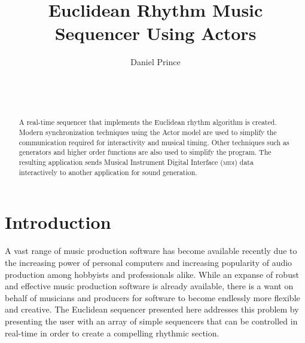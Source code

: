 \documentclass{sig-alternate-05-2015}
\begin{document}

\title{Euclidean Rhythm Music Sequencer Using Actors}


%
\author{
\alignauthor
Daniel Prince\\
       \\
       \\
       \\
}

\maketitle
\begin{abstract}
A real-time sequencer that implements the Euclidean rhythm algorithm is created. Modern synchronization techniques using the Actor model are used to simplify the communication required for interactivity and musical timing. Other techniques such as generators and higher order functions are also used to simplify the program. The resulting application sends Musical Instrument Digital Interface (\textsc{midi}) data interactively to another application for sound generation.
\end{abstract}

\section{Introduction}

A vast range of music production software has become available recently due to the increasing power of personal computers and increasing popularity of audio production among hobbyists and professionals alike. While an expanse of robust and effective music production software is already available, there is a want on behalf of musicians and producers for software to become endlessly more flexible and creative. The Euclidean sequencer presented here addresses this problem by presenting the user with an array of simple sequencers that can be controlled in real-time in order to create a compelling rhythmic section.
\end{document}
